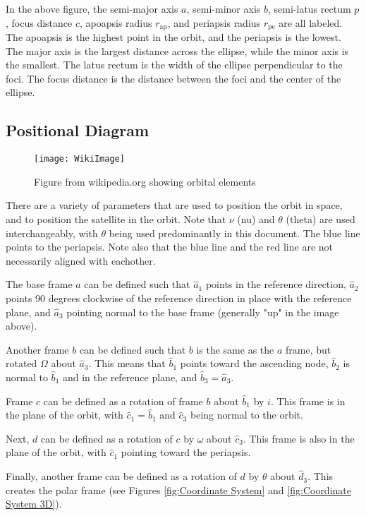 \documentclass[../main.tex]{subfiles}
\begin{document}
In the above figure, the semi-major axis $a$, semi-minor axis $b$, semi-latus rectum $p$, focus distance $c$, apoapsis radius $r_\text{ap}$, and periapsis radius $r_\text{pe}$ are all labeled. The apoapsis is the highest point in the orbit, and the periapsis is the lowest. The major axis is the largest distance across the ellipse, while the minor axis is the smallest. The latus rectum is the width of the ellipse perpendicular to the foci. The focus distance is the distance between the foci and the center of the ellipse.


\bigskip\bigskip
\subsection{Positional Diagram}
\begin{figure}[H]
    \centering
    \texttt{[image: WikiImage]}
    \caption{Figure from wikipedia.org showing orbital elements}\label{fig:Wiki Image}
\end{figure}
There are a variety of parameters that are used to position the orbit in space, and to position the satellite in the orbit. Note that $\nu$ (nu) and $\theta$ (theta) are used interchangeably, with $\theta$ being used predominantly in this document. The blue line points to the periapsis. Note also that the blue line and the red line are not necessarily aligned with eachother.

The base frame $a$ can be defined such that $\hat{a}_1$ points in the reference direction, $\hat{a}_2$ points 90 degrees clockwise of the reference direction in place with the reference plane, and $\hat{a}_3$ pointing normal to the base frame (generally "up" in the image above).

Another frame $b$ can be defined such that $b$ is the same as the $a$ frame, but rotated $\Omega$ about $\hat{a}_3$. This means that $\hat{b}_1$ points toward the ascending node, $\hat{b}_2$ is normal to $\hat{b}_1$ and in the reference plane, and $\hat{b}_3=\hat{a}_3$.

Frame $c$ can be defined as a rotation of frame $b$ about $\hat{b}_1$ by $i$. This frame is in the plane of the orbit, with $\hat{c}_1=\hat{b}_1$ and $\hat{c}_3$ being normal to the orbit.

Next, $d$ can be defined as a rotation of $c$ by $\omega$ about $\hat{c}_3$. This frame is also in the plane of the orbit, with $\hat{c}_1$ pointing toward the periapsis.

Finally, another frame can be defined as a rotation of $d$ by $\theta$ about $\hat{d}_3$. This creates the polar frame (see Figures \ref{fig:Coordinate System} and \ref{fig:Coordinate System 3D}).
\end{document}
